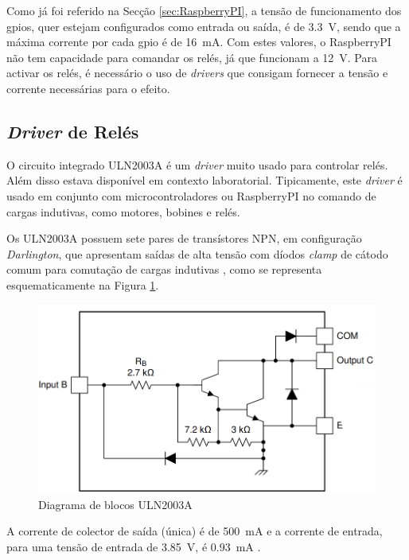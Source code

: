 Como já foi referido na Secção \ref{sec:RaspberryPI}, a tensão de funcionamento dos \acrshort{gpio}s, quer estejam configurados como entrada ou saída, é de \SI{3.3}{\volt}, sendo que a máxima corrente por cada \acrshort{gpio} é de \SI{16}{\mA}.
Com estes valores, o \gls{RaspberryPI} não tem capacidade para comandar os relés, já que funcionam a \SI{12}{\volt}. Para activar os relés, é necessário o uso de \textit{drivers} que consigam fornecer a tensão e corrente necessárias para o efeito.

\subsection{\textit{Driver} de Relés}
\label{sec:driver}
O circuito integrado ULN2003A é um \textit{driver} muito usado para controlar relés. Além disso estava disponível em contexto laboratorial.
Tipicamente, este \textit{driver} é usado em conjunto com microcontroladores ou \gls{RaspberryPI} no comando de cargas indutivas, como motores, bobines e relés.

Os ULN2003A possuem sete pares de transístores NPN, em configuração \textit{Darlington}, que apresentam saídas de alta tensão com díodos \textit{clamp} de cátodo comum para comutação de cargas indutivas \cite{ULN2003}, como se  representa esquematicamente na Figura \ref{fig:2003blocos}.

\begin{figure}[hbtp]
	\centering
	\includegraphics[width=1\textwidth]{figures/2003A_Darling.png}
	\caption{Diagrama de blocos ULN2003A \cite{ULN2003}}
	\label{fig:2003blocos}
\end{figure}

A corrente de colector de saída (única) é de \SI{500}{\mA} e a corrente de entrada, para uma tensão de entrada de \SI{3.85}{\volt}, é \SI{0.93}{\mA} \cite{ULN2003}.

